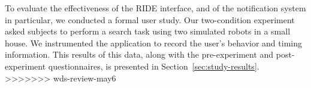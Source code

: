 To evaluate the effectiveness of the RIDE interface, and of the notification system in particular, we conducted a formal user study. Our two-condition experiment asked subjects to perform a search task using two simulated robots in a small house. We instrumented the application to record the user's behavior and timing information. This results of this data, along with the pre-experiment and post-experiment questionnaires, is presented in Section~\ref{sec:study-results}.
>>>>>>> wds-review-may6
